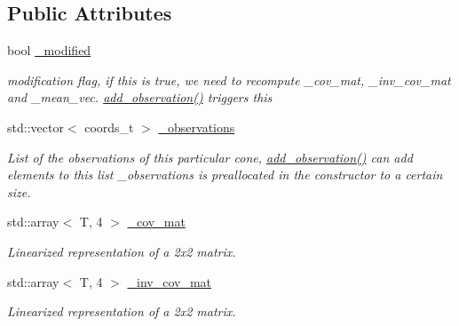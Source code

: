 \subsection*{Public Attributes}
\begin{DoxyCompactItemize}
\item 
\mbox{\label{classclara_1_1cone__state_a0e08ed1150f22d7edffbcb2152cf4d29}} 
bool \hyperlink{classclara_1_1cone__state_a0e08ed1150f22d7edffbcb2152cf4d29}{\+\_\+modified}
\begin{DoxyCompactList}\small\item\em modification flag, if this is true, we need to recompute {\ttfamily \+\_\+cov\+\_\+mat}, {\ttfamily \+\_\+inv\+\_\+cov\+\_\+mat} and {\ttfamily \+\_\+mean\+\_\+vec}. {\ttfamily \hyperlink{classclara_1_1cone__state_aee0e3d2bf97a5b06b8a052bf4c93f6ed}{add\+\_\+observation()}} triggers this \end{DoxyCompactList}\item 
std\+::vector$<$ coords\+\_\+t $>$ \hyperlink{classclara_1_1cone__state_ae5c8c1ba05533a80ab1874fb878888b9}{\+\_\+observations}
\begin{DoxyCompactList}\small\item\em List of the observations of this particular cone, {\ttfamily \hyperlink{classclara_1_1cone__state_aee0e3d2bf97a5b06b8a052bf4c93f6ed}{add\+\_\+observation()}} can add elements to this list {\ttfamily \+\_\+observations} is preallocated in the constructor to a certain size. \end{DoxyCompactList}\item 
std\+::array$<$ T, 4 $>$ \hyperlink{classclara_1_1cone__state_a2a5e7dc2078a6d5ef80b1bac25354e2f}{\+\_\+cov\+\_\+mat}
\begin{DoxyCompactList}\small\item\em Linearized representation of a 2x2 matrix. \end{DoxyCompactList}\item 
std\+::array$<$ T, 4 $>$ \hyperlink{classclara_1_1cone__state_af36bb866c831dfc5b7b199d6434511f4}{\+\_\+inv\+\_\+cov\+\_\+mat}
\begin{DoxyCompactList}\small\item\em Linearized representation of a 2x2 matrix. \end{DoxyCompactList}\item 
\mbox{\label{classclara_1_1cone__state_aa42f4654a82f825dc3b89d4ec0b03deb}} 

\end{DoxyCompactItemize}
